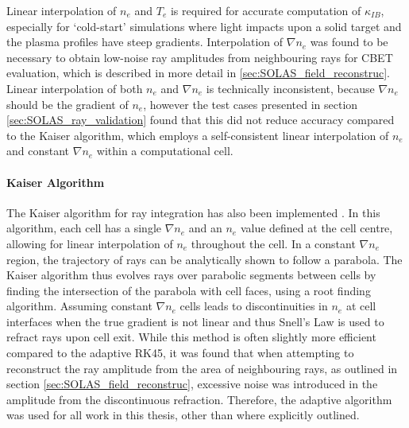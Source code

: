 Linear interpolation of $n_e$ and $T_e$ is required for accurate computation of $\kappa_{IB}$, especially for `cold-start' simulations where light impacts upon a solid target and the plasma profiles have steep gradients.
Interpolation of $\nabla n_e$ was found to be necessary to obtain low-noise ray amplitudes from neighbouring rays for \ac{CBET} evaluation, which is described in more detail in \ref{sec:SOLAS_field_reconstruc}.
Linear interpolation of both $n_e$ and $\nabla n_e$ is technically inconsistent, because $\nabla n_e$ should be the gradient of $n_e$, however the test cases presented in section \ref{sec:SOLAS_ray_validation} found that this did not reduce accuracy compared to the Kaiser algorithm, which employs a self-consistent linear interpolation of $n_e$ and constant $\nabla n_e$ within a computational cell.

\paragraph*{Kaiser Algorithm}
The Kaiser algorithm for ray integration has also been implemented \cite{kaiser_laser_2000}.
In this algorithm, each cell has a single $\nabla n_e$ and an $n_e$ value defined at the cell centre, allowing for linear interpolation of $n_e$ throughout the cell.
In a constant $\nabla n_e$ region, the trajectory of rays can be analytically shown to follow a parabola.
The Kaiser algorithm thus evolves rays over parabolic segments between cells by finding the intersection of the parabola with cell faces, using a root finding algorithm.
Assuming constant $\nabla n_e$ cells leads to discontinuities in $n_e$ at cell interfaces when the true gradient is not linear and thus Snell's Law is used to refract rays upon cell exit.
While this method is often slightly more efficient compared to the adaptive RK45, it was found that when attempting to reconstruct the ray amplitude from the area of neighbouring rays, as outlined in section \ref{sec:SOLAS_field_reconstruc}, excessive noise was introduced in the amplitude from the discontinuous refraction.
Therefore, the adaptive algorithm was used for all work in this thesis, other than where explicitly outlined.

